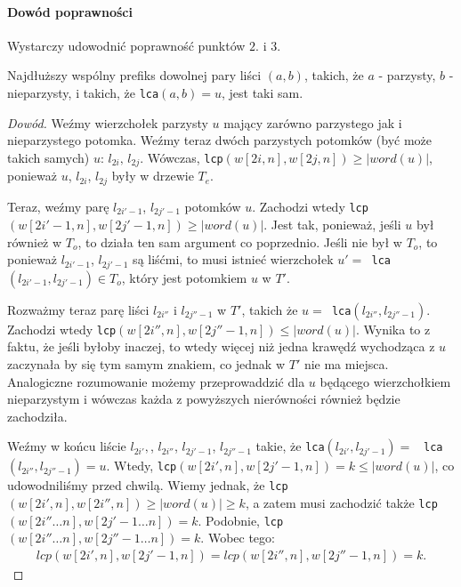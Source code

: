 \paragraph{Dowód poprawności}
Wystarczy udowodnić poprawność punktów $2.$ i $3.$
\begin{theorem}{}{}
Najdłuższy wspólny prefiks dowolnej pary liści $(a,b)$, takich, że $a$ - parzysty, $b$ - nieparzysty, i takich, że \verb|lca|$(a,b) = u$, jest taki sam.
\end{theorem}
\begin{proof}[Dowód]
Weźmy wierzchołek parzysty $u$ mający zarówno parzystego jak i nieparzystego potomka. Weźmy teraz dwóch parzystych potomków (być może takich samych) $u$: $l_{2i},\,l_{2j}$. Wówczas, \verb|lcp|$(w[2i,n],w[2j,n]) \geq |word(u)|$, ponieważ $u$, $l_{2i}$, $l_{2j}$ były w drzewie $T_e$.


Teraz, weźmy parę $l_{2i'-1}$, $l_{2j'-1}$ potomków $u$. Zachodzi wtedy \verb|lcp|$(w[2i'-1,n],w[2j'-1,n]) \geq |word(u)|$. Jest tak, ponieważ, jeśli $u$ był również w $T_o$, to działa ten sam argument co poprzednio. Jeśli nie był w $T_o$, to ponieważ $l_{2i'-1}$, $l_{2j'-1}$ są liśćmi, to musi istnieć wierzchołek $u' = $\verb| lca|$(l_{2i'-1}, l_{2j'-1}) \in T_o$, który jest potomkiem $u$ w $T'$. 


Rozważmy teraz parę liści $l_{2i''}$ i $l_{2j''-1}$ w $T'$, takich że $u = $\verb| lca|$(l_{2i''}, l_{2j''-1})$. Zachodzi wtedy \verb|lcp|$(w[2i'',n], w[2j''-1, n]) \leq |word(u)|$. Wynika to z faktu, że jeśli byłoby inaczej, to wtedy więcej niż jedna krawędź wychodząca z $u$ zaczynała by się tym samym znakiem, co jednak w $T'$ nie ma miejsca. Analogiczne rozumowanie możemy przeprowaddzić dla $u$ będącego wierzchołkiem nieparzystym i wówczas każda z powyższych nierówności również będzie zachodziła.

Weźmy w końcu liście $l_{2i'},$, $l_{2i''}$, $l_{2j'-1}$, $l_{2j''-1}$ takie, że \verb|lca|$(l_{2i'}, l_{2j'-1}) = $ \verb| lca|$(l_{2i''}, l_{2j''-1}) = u$. Wtedy, \verb|lcp|$(w[2i',n], w[2j'-1,n]) = k \leq |word(u)|$, co udowodniliśmy przed chwilą. Wiemy jednak, że \verb|lcp|$(w[2i',n], w[2i'',n]) \geq |word(u)| \geq k$, a zatem musi zachodzić także \verb|lcp|$(w[2i'' \ldots n], w[2j'-1 \ldots n]) = k$. Podobnie, \verb|lcp|$(w[2i'' \ldots n], w[2j''-1 \ldots n]) = k$. Wobec tego:
\begin{align*}
    lcp(w[2i',n],w[2j'-1,n]) = lcp(w[2i'',n], w[2j''-1,n]) = k.
\end{align*}
\end{proof}

